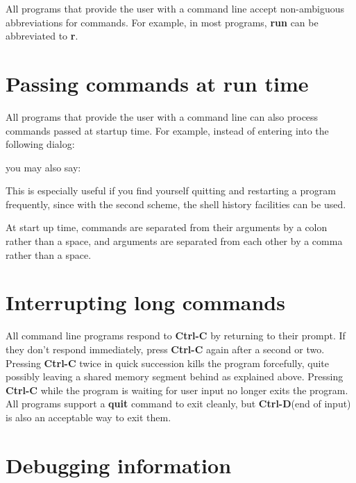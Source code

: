 \documentclass[12pt,oneside]{book}
\def\cmd#1{{\bf #1}}
\def\intr{{\bf Ctrl-C}\xspace}
\def\eoi{{\bf Ctrl-D}\xspace}
\begin{document}
All programs that provide the user with a command line accept
non-ambiguous abbreviations for commands. For example, in most
programs, \cmd{run} can be abbreviated to \cmd{r}.

\section{Passing commands at run time}

All programs that provide the user with a command line can also
process commands passed at startup time. For example, instead of
entering into the following dialog:
\begin{quotation}
\uprompt{}
\end{quotation}
you may also say:
\begin{quotation}
\uprompt{}
\end{quotation}
This is especially useful if you find yourself quitting and restarting
a program frequently, since with the second scheme, the shell history
facilities can be used.

At start up time, commands are separated from their arguments by a
colon rather than a space, and arguments are separated from each other
by a comma rather than a space.

\section{Interrupting long commands}

All command line programs respond to \intr by returning to
their prompt. If they don't respond immediately, press \intr
again after a second or two. Pressing \intr twice in quick
succession kills the program forcefully, quite possibly leaving a
shared memory segment behind as explained above. Pressing \intr
while the program is waiting for user input no longer exits the
program. All programs support a
\cmd{quit} command to exit cleanly, but \eoi (end of input) is
also an acceptable way to exit them.

\section{Debugging information}
\end{document}

